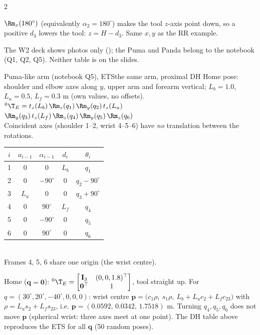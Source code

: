 \begin{multicols}{2}
\begin{worked}
$\Rm_x(180^\circ)$ (equivalently $\alpha_2=180^\circ$) makes the tool $z$-axis point down, so a positive $d_3$ lowers the tool: $z=H-d_3$. Same $x,y$ as the RR example. \chk
\end{worked}

The W2 deck shows photos only (); the Puma and Panda belong to the notebook (Q1, Q2, Q5). Neither table is on the slides.
\begin{twoway}{Puma-like arm (notebook Q5), ETS}{the same arm, proximal DH}
Home pose: shoulder and elbow axes along $y$, upper arm and forearm vertical; $L_b=1.0$, $L_u=0.5$, $L_f=0.3$ m (own values, no offsets).\\[2pt]
${}^0\T_E=t_z(L_b)\,\Rm_z(q_1)\,\Rm_y(q_2)\,t_z(L_u)$\\ $\Rm_y(q_3)\,t_z(L_f)\,\Rm_z(q_4)\,\Rm_y(q_5)\,\Rm_z(q_6)$\\[2pt]
Coincident axes (shoulder 1--2, wrist 4--5--6) have \emph{no} translation between the rotations.
\tcblower
\renewcommand{\arraystretch}{1.05}\begin{tabular}{@{}c|cccc@{}}$i$&$a_{i-1}$&$\alpha_{i-1}$&$d_i$&$\theta_i$\\\hline
1&0&0&$L_b$&$q_1$\\2&0&$-90^\circ$&0&$q_2-90^\circ$\\3&$L_u$&0&0&$q_3+90^\circ$\\4&0&$90^\circ$&$L_f$&$q_4$\\5&0&$-90^\circ$&0&$q_5$\\6&0&$90^\circ$&0&$q_6$\end{tabular}\\[2pt]
Frames 4, 5, 6 share one origin (the wrist centre).
\end{twoway}
\begin{worked}
Home ($\mathbf q=\mathbf 0$): ${}^0\T_E=\begin{bmatrix}\mathbf I_3&(0,0,1.8)^\top\\\mathbf 0^\top&1\end{bmatrix}$, tool straight up. For $q=(30^\circ,20^\circ,-40^\circ,0,0,0)$: wrist centre $\mathbf p=\big(c_1\rho,\ s_1\rho,\ L_b+L_uc_2+L_fc_{23}\big)$ with $\rho=L_us_2+L_fs_{23}$, i.e. $\mathbf p=(0.0592,\,0.0342,\,1.7518)$ m. Turning $q_4,q_5,q_6$ does not move $\mathbf p$ (spherical wrist: three axes meet at one point). The DH table above reproduces the ETS for all $\mathbf q$ (50 random poses). \chk
\end{worked}
\begin{fbx}

\end{fbx}
\end{multicols}
